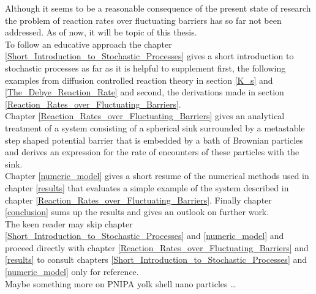 Although it seems to be a reasonable consequence of the present state of research the problem of reaction rates over fluctuating barriers has so far not been addressed. As of now, it will be topic of this thesis. \\
To follow an educative approach the chapter \ref{Short_Introduction_to_Stochastic_Processes} gives a short introduction to stochastic processes as far as it is helpful to supplement first, the following examples from diffusion controlled reaction theory in section \ref{K_s} and \ref{The_Debye_Reaction_Rate} and second, the derivations made in section \ref{Reaction_Rates_over_Fluctuating_Barriers}. \\
Chapter \ref{Reaction_Rates_over_Fluctuating_Barriers} gives an analytical treatment of a system consisting of a spherical sink surrounded by a metastable step shaped potential barrier that is embedded by a bath of Brownian particles and derives an expression for the rate of encounters of these particles with the sink. \\
Chapter \ref{numeric_model} gives a short resume of the numerical methods used in chapter \ref{results} that evaluates a simple example of the system described in chapter \ref{Reaction_Rates_over_Fluctuating_Barriers}. Finally chapter \ref{conclusion} sums up the results and gives an outlook on further work. \\

The keen reader may skip chapter \ref{Short_Introduction_to_Stochastic_Processes} and \ref{numeric_model} and proceed directly with chapter \ref{Reaction_Rates_over_Fluctuating_Barriers} and \ref{results} to consult chapters \ref{Short_Introduction_to_Stochastic_Processes} and \ref{numeric_model} only for reference. \\




 Maybe something more on PNIPA yolk shell nano particles \dots
